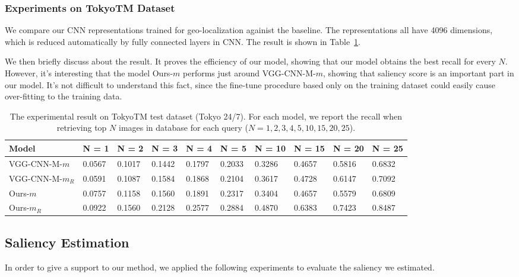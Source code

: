 \subsubsection{Experiments on TokyoTM Dataset}
\par
We compare our CNN representations trained for geo-localization againist the baseline. The representations all have 4096 dimensions, which is reduced automatically by fully connected layers in CNN. The result is shown in Table~\ref{table:netvlad-result}. 
\par
We then briefly discuss about the result. It proves the efficiency of our model, showing that our model obtains the best recall for every $N$. However, it's interesting that the model Ours-$m$ performs just around VGG-CNN-M-$m$, showing that saliency score is an important part in our model. It's not difficult to understand this fact, since the fine-tune procedure based only on the training dataset could easily cause over-fitting to the training data.

\begin{table}[htbp]
\begin{tabular}{l|l|l|l|l|l|l|l|l|l}
\textbf{Model} & \textbf{N = 1} & \textbf{N = 2}& \textbf{N = 3}& \textbf{N = 4}& \textbf{N = 5}& \textbf{N = 10}& \textbf{N = 15} & \textbf{N = 20} & \textbf{N = 25} \\
\hline
VGG-CNN-M-$m$ & 0.0567&0.1017& 0.1442& 0.1797& 0.2033& 0.3286& 0.4657& 0.5816& 0.6832 \\

VGG-CNN-M-$m_R$ & 0.0591& 0.1087& 0.1584& 0.1868& 0.2104& 0.3617& 0.4728& 0.6147& 0.7092 \\

Ours-$m$ & 0.0757& 0.1158& 0.1560& 0.1891& 0.2317& 0.3404& 0.4657& 0.5579& 0.6809 \\

Ours-$m_R$ & 0.0922 & 0.1560 & 0.2128 & 0.2577& 0.2884&0.4870&0.6383&0.7423&0.8487 

\end{tabular}
\caption{The experimental result on TokyoTM test dataset (Tokyo 24/7). For each model, we report the recall when retrieving top $N$ images in database for each query ($N = 1, 2, 3, 4, 5, 10, 15, 20, 25$).}


\label{table:netvlad-result}
\end{table}


\subsection{Saliency Estimation}
\par
In order to give a support to our method, we applied the following experiments to evaluate the saliency we estimated. 
